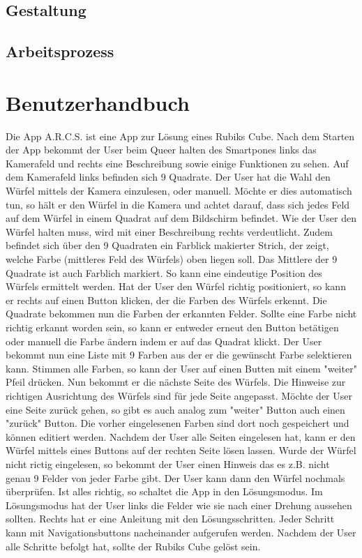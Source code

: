 \subsection{Gestaltung}  %
\subsection{Arbeitsprozess}  %

\section{Benutzerhandbuch}  %
Die App A.R.C.S. ist eine App zur Lösung eines Rubiks Cube.
Nach dem Starten der App bekommt der User beim Queer halten des Smartpones links das Kamerafeld und rechts
eine Beschreibung sowie einige Funktionen zu sehen. Auf dem Kamerafeld links befinden sich 9 Quadrate.
Der User hat die Wahl den Würfel mittels der Kamera einzulesen, oder manuell. Möchte er dies automatisch tun,
so hält er den Würfel in die Kamera und achtet darauf, dass sich jedes Feld auf dem Würfel in einem Quadrat
auf dem Bildschirm befindet. Wie der User den Würfel halten muss, wird mit einer Beschreibung rechts verdeutlicht.
Zudem befindet sich über den 9 Quadraten ein Farblick makierter Strich, der zeigt, welche Farbe (mittleres Feld
des Würfels) oben liegen soll. Das Mittlere der 9 Quadrate ist auch Farblich markiert. So kann eine eindeutige
Position des Würfels ermittelt werden. Hat der User den Würfel richtig positioniert, so kann er rechts auf einen
Button klicken, der die Farben des Würfels erkennt. Die Quadrate bekommen nun die Farben der erkannten Felder.
Sollte eine Farbe nicht richtig erkannt worden sein, so kann er entweder erneut den Button betätigen oder manuell
die Farbe ändern indem er auf das Quadrat klickt. Der User bekommt nun eine Liste mit 9 Farben aus der er die
gewünscht Farbe selektieren kann. Stimmen alle Farben, so kann der User auf einen Butten mit einem "weiter"
Pfeil drücken. Nun bekommt er die nächste Seite des Würfels. Die Hinweise zur richtigen Ausrichtung des Würfels
sind für jede Seite angepasst. Möchte der User eine Seite zurück gehen, so gibt es auch analog zum "weiter" Button
auch einen "zurück" Button. Die vorher eingelesenen Farben sind dort noch gespeichert und können editiert werden.
Nachdem der User alle Seiten eingelesen hat, kann er den Würfel mittels eines Buttons auf der rechten Seite lösen
lassen. Wurde der Würfel nicht rictig eingelesen, so bekommt der User einen Hinweis das es z.B. nicht genau 9
Felder von jeder Farbe gibt. Der User kann dann den Würfel nochmals überprüfen. Ist alles richtig, so schaltet
die App in den Lösungsmodus. Im Lösungsmodus hat der User links die Felder wie sie nach einer Drehung aussehen
sollten. Rechts hat er eine Anleitung mit den Lösungsschritten. Jeder Schritt kann mit Navigationsbuttons
nacheinander aufgerufen werden. Nachdem der User alle Schritte befolgt hat, sollte der Rubiks Cube gelöst sein.

